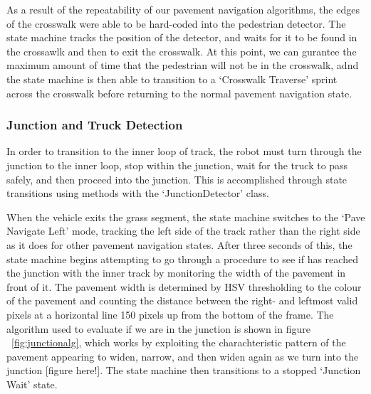 \documentclass[titlepage, twocolumn]{article}
\begin{document}
            As a result of the repeatability of our pavement navigation algorithms, the edges of the crosswalk were able to be hard-coded into the pedestrian detector. The state machine tracks the position of the detector, and waits for it to be found in the crossawlk and then to exit the crosswalk. At this point, we can gurantee the maximum amount of time that the pedestrian will not be in the crosswalk, adnd the state machine is then able to transition to a `Crosswalk Traverse' sprint across the crosswalk before returning to the normal pavement navigation state. 
            
        \subsubsection{Junction and Truck Detection}
            In order to transition to the inner loop of track, the robot must turn through the junction to the inner loop, stop within the junction, wait for the truck to pass safely, and then proceed into the junction. This is accomplished through state transitions using methods with the `JunctionDetector' class.

            When the vehicle exits the grass segment, the state machine switches to the `Pave Navigate Left' mode, tracking the left side of the track rather than the right side as it does for other pavement navigation states. After three seconds of this, the state machine begins attempting to go through a procedure to see if has reached the junction with the inner track by monitoring the width of the pavement in front of it. The pavement width is determined by HSV thresholding to the colour of the pavement and counting the distance between the right- and leftmost valid pixels at a horizontal line 150 pixels up from the bottom of the frame. The algorithm used to evaluate if we are in the junction is shown in figure ~\ref{fig:junctionalg}, which works by exploiting the charachteristic pattern of the pavement appearing to widen, narrow, and then widen again as we turn into the junction [figure here!]. The state machine then transitions to a stopped `Junction Wait' state. 
\end{document}
